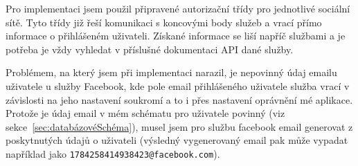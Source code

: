 Pro implementaci jsem použil připravené autorizační třídy pro jednotlivé sociální sítě.
Tyto třídy již řeší komunikaci s koncovými body služeb a vrací přímo informace o přihlášeném uživateli.
Získané informace se liší napříč službami a je potřeba je vždy vyhledat v příslušné dokumentaci \gls{API} dané služby.

Problémem, na který jsem při implementaci narazil, je nepovinný údaj emailu uživatele u služby Facebook, kde pole email přihlášeného uživatele služba vrací v závislosti na jeho nastavení soukromí a to i přes nastavení oprávnění mé aplikace.
Protože je údaj email v mém schématu pro uživatele povinný (viz sekce~\ref{sec:databázovéSchéma}), musel jsem pro službu facebook email generovat z poskytnutých údajů o uživateli (výsledný vygenerovaný email pak může vypadat například jako \texttt{1784258414938423@facebook.com}).
